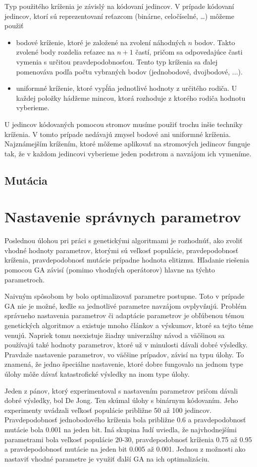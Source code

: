 Typ použitého kríženia je závislý na kódovaní jedincov.
V prípade kódovaní jedincov, ktorí sú reprezentovaní reťazcom (binárne, celočíselné, \ldots) môžeme použiť
\begin{itemize}\label{kap2:2.5:2.5.1:Crossover}
\item bodové kríženie, ktoré je založené na zvolení náhodných $n$ bodov. Takto zvolené body rozdelia reťazec na $n+1$ častí, pričom sa odpovedajúce časti vymenia s určitou pravdepodobnosťou. Tento typ kríženia sa ďalej pomenováva podľa počtu vybraných bodov (jednobodové, dvojbodové, ...).
\item uniformné kríženie, ktoré vypĺňa jednotlivé hodnoty z určitého rodiča. U každej položky hádžeme mincou, ktorá rozhoduje z ktorého rodiča hodnotu vyberieme.
\end{itemize}
U jedincov kódovaných pomocou stromov musíme použiť trochu inšie techniky kríženia. V tomto prípade nedávajú zmysel bodové ani uniformné kríženia. Najznámejším krížením, ktoré môžeme aplikovať na stromových jedincov funguje tak, že v každom jedincovi vyberieme jeden podstrom a navzájom ich vymeníme.

\subsection{Mutácia}\label{kap2:2.5:2.5.1:Mutation}



\section{Nastavenie správnych parametrov}\label{kap2:2.6:Parameters}
Poslednou úlohou pri práci s genetickými algoritmami je rozhodnúť, ako zvoliť vhodné hodnoty parametrov, ktorými sú veľkosť populácie, pravdepodobnosť kríženia, pravdepodobnosť mutácie prípadne hodnota elitizmu. Hľadanie riešenia pomocou GA závisí (pomimo vhodných operátorov) hlavne na týchto parametroch.

Naivným spôsobom by bolo optimalizovať parametre postupne. Toto v prípade GA nie je možné, keďže sa jednotlivé parametre navzájom ovplyvňujú. Problém správneho nastavenia parametrov či adaptácie parametrov je obľúbenou témou genetických algoritmov a existuje mnoho článkov a výskumov, ktoré sa tejto téme venujú. Napriek tomu neexistuje žiadny univerzálny návod a väčšinou sa používajú také hodnoty parametrov, ktoré už v minulosti dávali dobré výsledky. Pravdaže nastavenie parametrov, vo väčšine prípadov, závisí na typu úlohy. To znamená, že jedno špeciálne nastavenie, ktoré dobre fungovalo na jednom type úlohy môže dávať katastrofické výsledky na inom type úlohy.

Jeden z pánov, ktorý experimentoval s nastavením parametrov pričom dávali dobré výsledky, bol De Jong. Ten skúmal úlohy s binárnym kódovaním. Jeho experimenty uvádzali veľkosť populácie približne 50 až 100 jedincov. Pravdepodobnosť jednobodového kríženia bola približne 0.6 a pravdepodobnosť mutácie bola 0.001 na jeden bit. Iná skupina ľudí uviedla, že najvhodnejšími parametrami bola veľkosť populácie 20-30, pravdepodobnosť kríženia 0.75 až 0.95 a pravdepodobnosť mutácie na jeden bit 0.005 až 0.001. Jednou z možnosti ako nastaviť vhodné parametre je využiť ďalší GA na ich optimalizáciu.